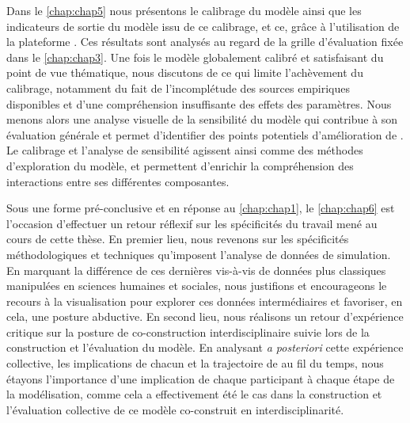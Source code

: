 Dans le \cref{chap:chap5} nous présentons le calibrage du modèle \simfeodal{} ainsi que les indicateurs de sortie du modèle issu de ce calibrage, et ce, grâce à l'utilisation de la plateforme \simedb{}. Ces résultats sont analysés au regard de la grille d'évaluation fixée dans le \cref{chap:chap3}. Une fois le modèle globalement calibré et satisfaisant du point de vue thématique, nous discutons de ce qui limite l'achèvement du calibrage, notamment du fait de l'incomplétude des sources empiriques disponibles et d'une compréhension insuffisante des effets des paramètres. Nous menons alors une analyse visuelle de la sensibilité du modèle qui contribue à son évaluation générale et permet d'identifier des points potentiels d'amélioration de \simfeodal{}. Le calibrage et l'analyse de sensibilité agissent ainsi comme des méthodes d'exploration du modèle, et permettent d'enrichir la compréhension des interactions entre ses différentes composantes.

Sous une forme \og pré-conclusive\fg{} et en réponse au \cref{chap:chap1}, le \cref{chap:chap6} est l'occasion d'effectuer un retour réflexif sur les spécificités du travail mené au cours de cette thèse. En premier lieu, nous revenons sur les spécificités méthodologiques et techniques qu'imposent l'analyse de données de simulation. En marquant la différence de ces dernières vis-à-vis de données plus classiques manipulées en sciences humaines et sociales, nous justifions et encourageons le recours à la visualisation pour explorer ces \og données intermédiaires\fg{} et favoriser, en cela, une posture abductive. En second lieu, nous réalisons un retour d'expérience critique sur la posture de co-construction interdisciplinaire suivie lors de la construction et l'évaluation du modèle. En analysant \textit{a posteriori} cette expérience collective, les implications de chacun et la trajectoire de \simfeodal{} au fil du temps, nous étayons l'importance d'une implication de chaque participant à chaque étape de la modélisation, comme cela a effectivement été le cas dans la construction et l'évaluation collective de ce modèle co-construit en interdisciplinarité.



